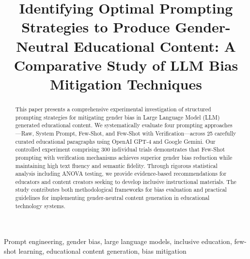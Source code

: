 \documentclass[conference]{IEEEtran}
\begin{document}
\title{Identifying Optimal Prompting Strategies to Produce Gender-Neutral Educational Content: A Comparative Study of LLM Bias Mitigation Techniques
}

\author{
\and
{}
}

\maketitle

\begin{abstract}
This paper presents a comprehensive experimental investigation of structured prompting strategies for mitigating gender bias in Large Language Model (LLM) generated educational content. We systematically evaluate four prompting approaches—Raw, System Prompt, Few-Shot, and Few-Shot with Verification—across 25 carefully curated educational paragraphs using OpenAI GPT-4 and Google Gemini. Our controlled experiment comprising 300 individual trials demonstrates that Few-Shot prompting with verification mechanisms achieves superior gender bias reduction while maintaining high text fluency and semantic fidelity. Through rigorous statistical analysis including ANOVA testing, we provide evidence-based recommendations for educators and content creators seeking to develop inclusive instructional materials. The study contributes both methodological frameworks for bias evaluation and practical guidelines for implementing gender-neutral content generation in educational technology systems.
\end{abstract}

\begin{IEEEkeywords}
Prompt engineering, gender bias, large language models, inclusive education, few-shot learning, educational content generation, bias mitigation
\end{IEEEkeywords}

\end{document}

